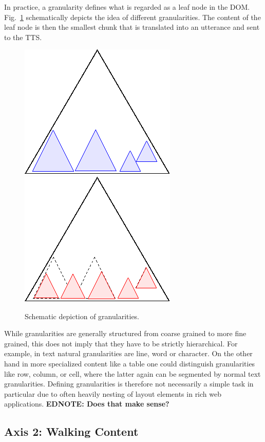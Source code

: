 \documentclass{acm_proc_article-sp}
\newcommand\ednote[1]{\typeout{There is still a note!!!}%
  {\bf EDNOTE: #1}}
\begin{document}
In practice, a granularity defines what is regarded as a leaf node in the
DOM. Fig.~\ref{fig:granularity} schematically depicts the idea of different
granularities. The content of the leaf node is then the smallest chunk that is
translated into an utterance and sent to the TTS.

\begin{figure}[ht!]
  \begin{center}
    \leavevmode
    \includegraphics[width=.4\columnwidth]{images/granularity1}
    \includegraphics[width=.4\columnwidth]{images/granularity2}
    \caption{Schematic depiction of granularities.}
    \label{fig:granularity}
  \end{center}
\end{figure}

While granularities are generally structured from coarse grained to more fine
grained, this does not imply that they have to be strictly hierarchical. For
example, in text natural granularities are line, word or character. On the other
hand in more specialized content like a table one could distinguish
granularities like row, column, or cell, where the latter again can be segmented
by normal text granularities.  Defining granularities is therefore not
necessarily a simple task in particular due to often heavily nesting of layout
elements in rich web applications.\ednote{Does that make sense?}


\subsection{Axis 2: Walking Content}
\label{sec:ax2}
\end{document}
